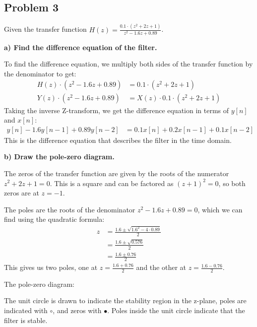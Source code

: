\documentclass{article}
\begin{document}
\subsection*{Problem 3}

Given the transfer function \( H(z) = \frac{0.1 \cdot (z^2 + 2z + 1)}{z^2 - 1.6z + 0.89} \).

\textbf{a) Find the difference equation of the filter.}

To find the difference equation, we multiply both sides of the transfer function by the denominator to get:
\begin{align*}
    H(z) \cdot (z^2 - 1.6z + 0.89) &= 0.1 \cdot (z^2 + 2z + 1) \\
    Y(z) \cdot (z^2 - 1.6z + 0.89) &= X(z) \cdot 0.1 \cdot (z^2 + 2z + 1)
\end{align*}
Taking the inverse Z-transform, we get the difference equation in terms of \( y[n] \) and \( x[n] \):
\begin{align*}
    y[n] - 1.6y[n-1] + 0.89y[n-2] &= 0.1x[n] + 0.2x[n-1] + 0.1x[n-2]
\end{align*}
This is the difference equation that describes the filter in the time domain.

\textbf{b) Draw the pole-zero diagram.}

The zeros of the transfer function are given by the roots of the numerator \( z^2 + 2z + 1 = 0 \). This is a square and can be factored as \( (z + 1)^2 = 0 \), so both zeros are at \( z = -1 \).

The poles are the roots of the denominator \( z^2 - 1.6z + 0.89 = 0 \), which we can find using the quadratic formula:
\begin{align*}
    z &= \frac{1.6 \pm \sqrt{1.6^2 - 4 \cdot 0.89}}{2} \\
    &= \frac{1.6 \pm \sqrt{0.576}}{2} \\
    &= \frac{1.6 \pm 0.76}{2}
\end{align*}
This gives us two poles, one at \( z = \frac{1.6 + 0.76}{2} \) and the other at \( z = \frac{1.6 - 0.76}{2} \).

The pole-zero diagram:

\begin{center}
\end{center}

The unit circle is drawn to indicate the stability region in the z-plane, poles are indicated with \(\circ\), and zeros with \(\bullet\). Poles inside the unit circle indicate that the filter is stable.
\end{document}

